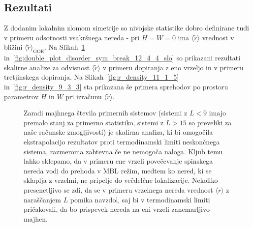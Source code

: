\subsection{Rezultati}
\label{odmik_rezultati}
Z dodanim lokalnim zlomom simetrije so nivojske statistike dobro definirane tudi v primeru odsotnosti vsakršnega nereda - pri $H=W=0$ ima $\langle \tilde{r}\rangle$ vrednost v bližini  $\langle \tilde{r}\rangle_\mathrm{GOE}$. Na Slikah~\ref{fig:double_plot_disorder_sym_break_13_1_6_slo} in~\ref{fig:double_plot_disorder_sym_break_12_4_4_slo} so prikazani rezultati skalirne analize za odvisnost $\langle \tilde{r}\rangle$ v primeru dopiranja z eno vrzeljo in v primeru tretjinskega dopiranja. Na Slikah~\ref{fig:r_density_11_1_5} in~\ref{fig:r_density_9_3_3} sta prikazana še primera sprehodov po prostoru parametrov $H$ in $W$ pri izračunu $\langle \tilde{r} \rangle$.
 \begin{figure}[H]
\caption{Zaradi majhnega števila primernih sistemov (sistemi z $L<9$ imajo premalo stanj za primerno statistiko, sistemi z $L>15$ so preveliki za naše računske zmogljivosti) je skalirna analiza, ki bi omogočila ekstrapolacijo rezultatov proti termodinamski limiti neskončnega sistema, razmeroma zahtevna če ne nemogoča naloga. Kljub temu lahko sklepamo, da v primeru ene vrzeli povečevanje spinskega nereda vodi do prehoda v MBL režim, medtem ko nered, ki se sklaplja z vrzelmi, ne pripelje do večdelčne lokalizacije. Nekoliko presenetljivo se zdi, da se v primeru vrzelnega nereda vrednost $\langle \tilde{r}\rangle$ z naraščanjem $L$ pomika navzdol, saj bi v termodinamski limiti pričakovali, da bo prispevek nereda na eni vrzeli zanemarljivo majhen. }
\label{fig:double_plot_disorder_sym_break_13_1_6_slo}
\end{figure} 
